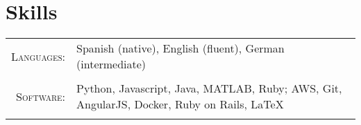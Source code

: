 \documentclass[a4paper,10pt]{article}
\begin{document}

\section{Skills}
\begin{tabularx}{\textwidth}{rX}
 \textsc{Languages:}& Spanish (native), English (fluent), German (intermediate)\\ \\ 
\textsc{Software:}& Python, Javascript, Java, MATLAB, Ruby; AWS, Git, AngularJS, Docker, Ruby on Rails, \LaTeX \\ \\ 
\end{tabularx}
\end{document}
